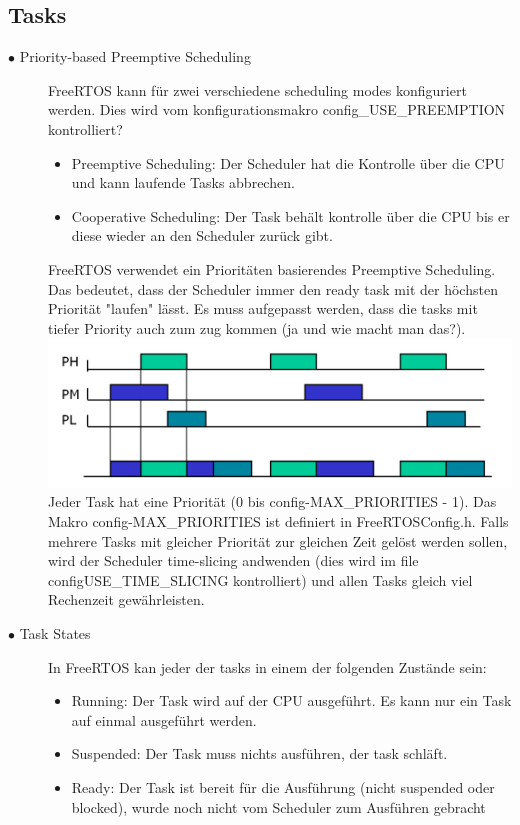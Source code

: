 \documentclass[a4paper, 8pt]{extarticle}
\begin{document}
\begin{multicols*}{3}
			\subsection{Tasks}	
				\begin{description}
					\item[$\bullet$ Priority-based Preemptive Scheduling]
						FreeRTOS kann für zwei verschiedene scheduling modes konfiguriert werden. Dies wird vom konfigurationsmakro config\_USE\_PREEMPTION 
						kontrolliert?
						\begin{itemize}
							\item Preemptive Scheduling: Der Scheduler hat die Kontrolle über die CPU und kann laufende Tasks abbrechen.
							\item Cooperative Scheduling: Der Task behält kontrolle über die CPU bis er diese wieder an den Scheduler zurück gibt.
						\end{itemize}
						FreeRTOS verwendet ein Prioritäten basierendes Preemptive Scheduling. Das bedeutet, dass der Scheduler immer den ready task mit der 
						höchsten Priorität "laufen" lässt. Es muss aufgepasst werden, dass die tasks mit tiefer Priority auch zum zug kommen (ja und wie macht man 
						das?).
						\includegraphics[width=0.6\linewidth,left]{img/Prioritybased_preemptive_scheduling.PNG}
						Jeder Task hat eine Priorität (0 bis config-MAX\_PRIORITIES - 1). Das Makro config-MAX\_PRIORITIES ist definiert in FreeRTOSConfig.h.
						Falls mehrere Tasks mit gleicher Priorität zur gleichen Zeit gelöst werden sollen, wird der Scheduler time-slicing andwenden (dies wird im file
						configUSE\_TIME\_SLICING kontrolliert) und allen Tasks
						gleich viel Rechenzeit gewährleisten.
					\item[$\bullet$ Task States]
						In FreeRTOS kan jeder der tasks in einem der folgenden Zustände sein:
							\begin{itemize}
								\item Running: Der Task wird auf der CPU ausgeführt. Es kann nur ein Task auf einmal ausgeführt werden.
								\item Suspended: Der Task muss nichts ausführen, der task schläft.
								\item Ready: Der Task ist bereit für die Ausführung (nicht suspended oder blocked), wurde noch nicht vom Scheduler zum Ausführen gebracht

\end{itemize}
\end{description}
\end{multicols*}
\end{document}

